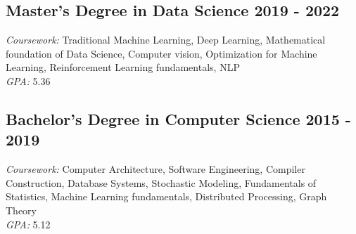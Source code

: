 \subsection{Master's Degree in Data Science \hfill 2019 - 2022\\}
\vspace{0.7\baselineskip}
\textit{Coursework:} Traditional Machine Learning, Deep Learning, Mathematical foundation of Data Science,
Computer vision, Optimization for Machine Learning, Reinforcement Learning fundamentals, NLP\\
\textit{GPA:} 5.36
\vspace{0.35\baselineskip}


\subsection{Bachelor's Degree in Computer Science \hfill 2015 - 2019\\}
\vspace{0.7\baselineskip}
\textit{Coursework:}  Computer Architecture, Software Engineering, Compiler Construction, Database Systems,
Stochastic Modeling, Fundamentals of Statistics, Machine Learning fundamentals, Distributed Processing, Graph Theory\\
\textit{GPA:} 5.12
\vspace{0.35\baselineskip}
